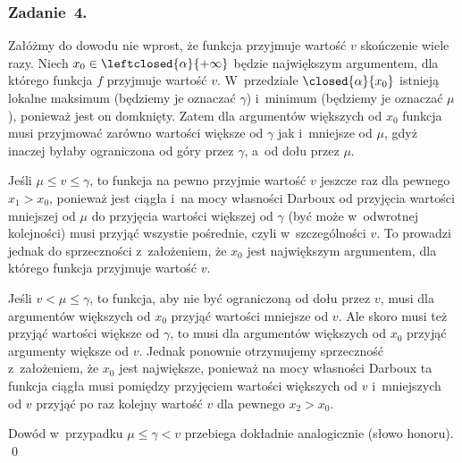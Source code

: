 \subsubsection*{Zadanie~4.}
Załóżmy do dowodu nie wprost, że funkcja przyjmuje wartość \(v\) skończenie wiele razy. Niech \(x_0 \in \leftclosed{\alpha}{+\infty}\) będzie największym argumentem, dla którego funkcja \(f\) przyjmuje wartość \(v\). W~przedziale \(\closed{\alpha}{x_0}\) istnieją lokalne maksimum (będziemy je oznaczać \(\gamma\)) i~minimum (będziemy je oznaczać \(\mu\)), ponieważ jest on domknięty. Zatem dla argumentów większych od \(x_0\) funkcja musi przyjmować zarówno wartości większe od \(\gamma\) jak i~mniejsze od \(\mu\), gdyż inaczej byłaby ograniczona od góry przez \(\gamma\), a~od dołu przez \(\mu\).

Jeśli \(\mu \leq v \leq \gamma\), to funkcja na pewno przyjmie wartość \(v\) jeszcze raz dla pewnego \(x_1 > x_0\), ponieważ jest ciągła i~na mocy własności Darboux od przyjęcia wartości mniejszej od \(\mu\) do przyjęcia wartości większej od \(\gamma\) (być może w~odwrotnej kolejności) musi przyjąć wszystie pośrednie, czyli w~szczególności \(v\). To prowadzi jednak do sprzeczności z~założeniem, że \(x_0\) jest największym argumentem, dla którego funkcja przyjmuje wartość \(v\). 

Jeśli \(v < \mu \leq \gamma\), to funkcja, aby nie być ograniczoną od dołu przez \(v\), musi dla argumentów większych od \(x_0\) przyjąć wartości mniejsze od \(v\). Ale skoro musi też przyjąć wartości większe od \(\gamma\), to musi dla argumentów większych od \(x_0\) przyjąć argumenty większe od \(v\). Jednak ponownie otrzymujemy sprzeczność z~założeniem, że \(x_0\) jest największe, ponieważ na mocy własności Darboux ta funkcja ciągła musi pomiędzy przyjęciem wartości większych od \(v\) i~mniejszych od \(v\) przyjąć po raz kolejny wartość \(v\) dla pewnego \(x_2 > x_0\).

Dowód w~przypadku \(\mu \leq \gamma < v\) przebiega dokładnie analogicznie (słowo honoru).
\qed
